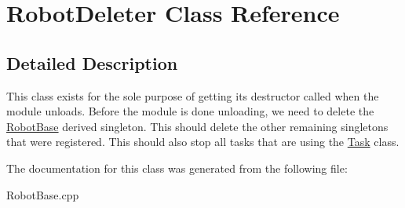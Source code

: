 \hypertarget{classRobotDeleter}{\section{\-Robot\-Deleter \-Class \-Reference}
\label{classRobotDeleter}
}


\subsection{\-Detailed \-Description}
\-This class exists for the sole purpose of getting its destructor called when the module unloads. \-Before the module is done unloading, we need to delete the \hyperlink{classRobotBase}{\-Robot\-Base} derived singleton. \-This should delete the other remaining singletons that were registered. \-This should also stop all tasks that are using the \hyperlink{classTask}{\-Task} class. 

\-The documentation for this class was generated from the following file\-:\begin{DoxyCompactItemize}
\item 
\-Robot\-Base.\-cpp\end{DoxyCompactItemize}
